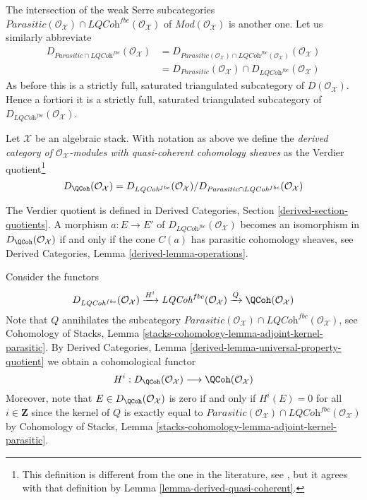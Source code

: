 \medskip\noindent
The intersection of the weak Serre subcategories
$\textit{Parasitic}(\mathcal{O}_\mathcal{X}) \cap
\textit{LQCoh}^{fbc}(\mathcal{O}_\mathcal{X})$
of $\textit{Mod}(\mathcal{O}_\mathcal{X})$
is another one.
Let us similarly abbreviate
\begin{align*}
D_{\textit{Parasitic} \cap \textit{LQCoh}^{fbc}}(\mathcal{O}_\mathcal{X})
& =
D_{\textit{Parasitic}(\mathcal{O}_\mathcal{X}) \cap
\textit{LQCoh}^{fbc}(\mathcal{O}_\mathcal{X})}(\mathcal{O}_\mathcal{X}) \\
& =
D_{\textit{Parasitic}}(\mathcal{O}_\mathcal{X})
\cap
D_{\textit{LQCoh}^{fbc}}(\mathcal{O}_\mathcal{X})
\end{align*}
As before this is a strictly full, saturated triangulated subcategory of
$D(\mathcal{O}_\mathcal{X})$. Hence a fortiori it is a
strictly full, saturated triangulated subcategory of
$D_{\textit{LQCoh}^{fbc}}(\mathcal{O}_\mathcal{X})$.

\begin{definition}
\label{definition-derived}
Let $\mathcal{X}$ be an algebraic stack. With notation as above
we define the {\it derived category of $\mathcal{O}_\mathcal{X}$-modules with
quasi-coherent cohomology sheaves} as the Verdier quotient\footnote{This
definition is different from the one in the literature, see
\cite[6.3]{olsson_sheaves}, but it agrees with that definition
by Lemma \ref{lemma-derived-quasi-coherent}.}
$$
D_\QCoh(\mathcal{O}_\mathcal{X}) =
D_{\textit{LQCoh}^{fbc}}(\mathcal{O}_\mathcal{X})/
D_{\textit{Parasitic} \cap \textit{LQCoh}^{fbc}}(\mathcal{O}_\mathcal{X})
$$
\end{definition}

\noindent
The Verdier quotient is defined in Derived Categories, Section
\ref{derived-section-quotients}. A morphism
$a : E \to E'$ of $D_{\textit{LQCoh}^{fbc}}(\mathcal{O}_\mathcal{X})$
becomes an isomorphism in $D_\QCoh(\mathcal{O}_\mathcal{X})$ if and
only if the cone $C(a)$ has parasitic cohomology sheaves, see
Derived Categories, Lemma \ref{derived-lemma-operations}.

\medskip\noindent
Consider the functors
$$
D_{\textit{LQCoh}^{fbc}}(\mathcal{O}_\mathcal{X})
\xrightarrow{H^i}
\textit{LQCoh}^{fbc}(\mathcal{O}_\mathcal{X})
\xrightarrow{Q}
\QCoh(\mathcal{O}_\mathcal{X})
$$
Note that $Q$ annihilates the subcategory
$\textit{Parasitic}(\mathcal{O}_\mathcal{X}) \cap
\textit{LQCoh}^{fbc}(\mathcal{O}_\mathcal{X})$, see
Cohomology of Stacks,
Lemma \ref{stacks-cohomology-lemma-adjoint-kernel-parasitic}.
By
Derived Categories, Lemma \ref{derived-lemma-universal-property-quotient}
we obtain a cohomological functor
\begin{equation}
\label{equation-Hi-quasi-coherent}
H^i :
D_\QCoh(\mathcal{O}_\mathcal{X})
\longrightarrow
\QCoh(\mathcal{O}_\mathcal{X})
\end{equation}
Moreover, note that $E \in D_\QCoh(\mathcal{O}_\mathcal{X})$
is zero if and only if $H^i(E) = 0$ for all $i \in \mathbf{Z}$
since the kernel of $Q$ is exactly equal to
$\textit{Parasitic}(\mathcal{O}_\mathcal{X}) \cap
\textit{LQCoh}^{fbc}(\mathcal{O}_\mathcal{X})$ by Cohomology of Stacks,
Lemma \ref{stacks-cohomology-lemma-adjoint-kernel-parasitic}.

